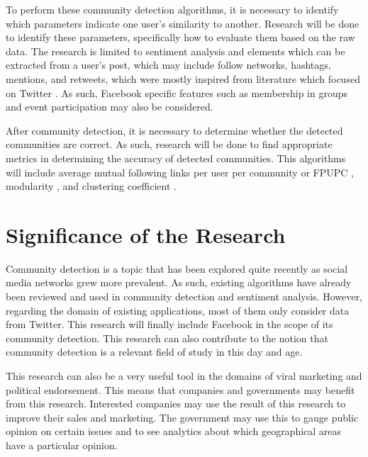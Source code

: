 To perform these community detection algorithms, it is necessary to identify which parameters indicate one user’s similarity to another. Research will be done to identify these parameters, specifically how to evaluate them based on the raw data. The research is limited to sentiment analysis and elements which can be extracted from a user’s post, which may include follow networks, hashtags, mentions, and retweets, which were mostly inspired from literature which focused on Twitter \cite{Deitrick:2013,Zhang:2012,Lim:2012:1}. As such, Facebook specific features such as membership in groups and event participation may also be considered.

After community detection, it is necessary to determine whether the detected communities are correct. As such, research will be done to find appropriate metrics in determining the accuracy of detected communities. This algorithms will include average mutual following links per user per community or FPUPC \cite{Zhang:2012}, modularity \cite{Deitrick:2013}, and clustering coefficient \cite{Lim:2012:1}.

\section{Significance of the Research}
\label{sec:significance}

Community detection is a topic that has been explored quite recently as social media networks grew more prevalent. As such, existing algorithms have already been reviewed and used in community detection and sentiment analysis. However, regarding the domain of existing applications, most of them only consider data from Twitter. This research will finally include Facebook in the scope of its community detection. This research can also contribute to the notion that community detection is a relevant field of study in this day and age.

This research can also be a very useful tool in the domains of viral marketing and political endorsement. This means that companies and governments may benefit from this research. Interested companies may use the result of this research to improve their sales and marketing. The government may use this to gauge public opinion on certain issues and to see analytics about which geographical areas have a particular opinion. 